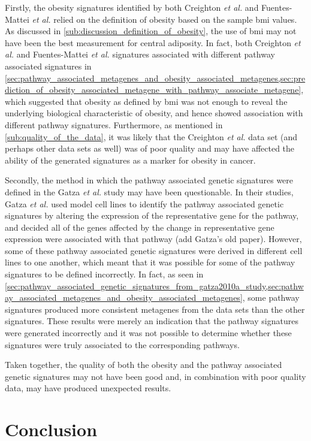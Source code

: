 Firstly, the obesity signatures identified by both Creighton \textit{et al.} and Fuentes-Mattei \textit{et al.} relied on the definition of obesity based on the sample \gls{bmi} values.
As discussed in \cref{sub:discussion_definition_of_obesity}, the use of \gls{bmi} may not have been the best measurement for central adiposity.
In fact, both Creighton \textit{et al.} and Fuentes-Mattei \textit{et al.} signatures associated with different pathway associated signatures in \cref{sec:pathway_associated_metagenes_and_obesity_associated_metagenes,sec:prediction_of_obesity_associated_metagene_with_pathway_associate_metagene}, which suggested that obesity as defined by \gls{bmi} was not enough to reveal the underlying biological characteristic of obesity, and hence showed association with different pathway signatures.
Furthermore, as mentioned in \cref{sub:quality_of_the_data}, it was likely that the Creighton \textit{et al.} data set (and perhaps other data sets as well) was of poor quality and may have affected the ability of the generated signatures as a marker for obesity in cancer.

Secondly, the method in which the pathway associated genetic signatures were defined in the Gatza \textit{et al.} study may have been questionable.
In their studies, Gatza \textit{et al.} used model cell lines to identify the pathway associated genetic signatures by altering the expression of the representative gene for the pathway, and decided all of the genes affected by the change in representative gene expression were associated with that pathway \citep{Gatza2010a} (add Gatza's old paper).
However, some of these pathway associated genetic signatures were derived in different cell lines to one another, which meant that it was possible for some of the pathway signatures to be defined incorrectly.
In fact, as seen in \cref{sec:pathway_associated_genetic_signatures_from_gatza2010a_study,sec:pathway_associated_metagenes_and_obesity_associated_metagenes}, some pathway signatures produced more consistent metagenes from the data sets than the other signatures.
These results were merely an indication that the pathway signatures were generated incorrectly and it was not possible to determine whether these signatures were truly associated to the corresponding pathways.

Taken together, the quality of both the obesity and the pathway associated genetic signatures may not have been good and, in combination with poor quality data, may have produced unexpected results.

\section{Conclusion}
\label{sec:conclusion}

